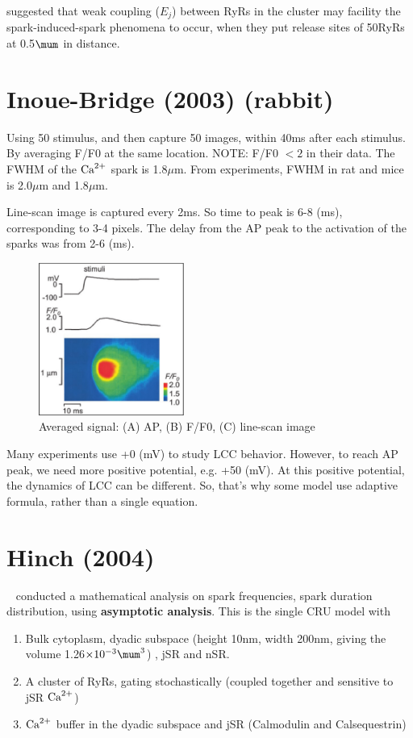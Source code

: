 \citep{sobie2006} suggested that weak coupling ($E_j$) between RyRs in the
cluster may facility the spark-induced-spark phenomena to occur, when they put
release sites of 50RyRs at 0.5$\mum$ in distance.
	
\section{Inoue-Bridge (2003) (rabbit)}
\label{sec:spark_Inoue-Bridge_2003}

Using 50 stimulus, and then capture 50 images, within 40ms after each stimulus.
By averaging F/F0 at the same location. NOTE: F/F0 $< 2$ in their data. The FWHM
of the ${\text{Ca}^{2+}}$ spark is 1.8$\mu$m. From experiments, FWHM in rat and mice is
2.0$\mu$m and 1.8$\mu$m. 

Line-scan image is captured every 2ms. So time to peak is 6-8 (ms),
corresponding to 3-4 pixels. The delay from the AP peak to the activation of the
sparks was from 2-6 (ms).

\begin{figure}[hbt]
  \centerline{\includegraphics[height=5cm,
    angle=0]{./images/spark_Inoue2003.eps}}
\caption{Averaged signal: (A) AP, (B) F/F0, (C) line-scan image}
\label{fig:Wenckebach}
\end{figure}

Many experiments use +0 (mV) to study LCC behavior. However, to reach AP peak,
we need more positive potential, e.g. +50 (mV). At this positive potential, the
dynamics of LCC can be different. So, that's why some model use adaptive
formula, rather than a single equation.


\section{Hinch (2004)}
\label{sec:hinch-2004}

~\citep{hinch2004mag} conducted a mathematical analysis on spark frequencies,
spark duration distribution, using {\bf asymptotic analysis}. This is the single
CRU model with
\begin{enumerate}
  \item Bulk cytoplasm, dyadic subspace (height 10nm, width
  200nm, giving the volume 1.26$\times 10^{-3}\mum^3$)
  \citep{frank1990}, jSR and nSR.
  \item A cluster of RyRs, gating stochastically (coupled together and
  sensitive to jSR ${\text{Ca}^{2+}}$)
  \item ${\text{Ca}^{2+}}$ buffer in the dyadic subspace and jSR (Calmodulin and
  Calsequestrin)
\end{enumerate}

